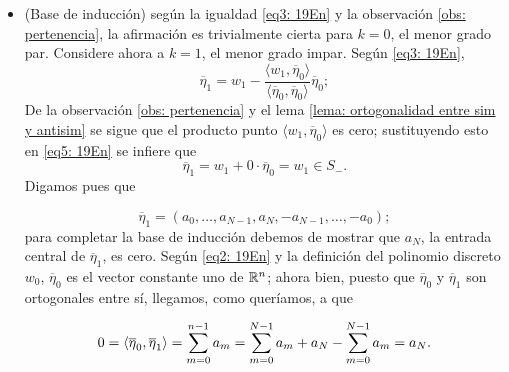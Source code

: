 \begin{itemize}

\item (Base de inducción) según la igualdad
\eqref{eq3: 19En} y la observación 
\ref{obs: pertenencia}, la afirmación 
es trivialmente cierta para $k=0$, el menor grado par.
Considere ahora a $k=1$, el menor grado impar. Según 
\eqref{eq3: 19En}, 
\begin{equation}
\label{eq5: 19En}
\overline{\eta}_{1}= w_{1}
- \frac{\langle w_{1}, \overline{\eta}_{0} \rangle}
{\langle \overline{\eta}_{0}, \overline{\eta}_{0} \rangle}\overline{\eta}_{0};
\end{equation}
De la observación 
\ref{obs: pertenencia} y el lema
\ref{lema: ortogonalidad entre sim y antisim} se sigue
que el producto punto $\langle w_{1}, \overline{\eta}_{0} \rangle$
es cero; sustituyendo esto en \eqref{eq5: 19En}
se infiere que 
\[
\overline{\eta}_{1} = w_{1} + 0 \cdot \overline{\eta}_{0}=
w_{1} \in S_{-}.
\]
Digamos pues que

\[
\overline{\eta}_{1} = 
(a_{0}, \ldots , a_{N-1}, a_{N}, -a_{N-1}, \ldots , -a_{0} );
\]
para completar la base de inducción debemos de mostrar
que $a_{N}$, la entrada central de $\overline{\eta}_{1}$,
es cero. Según \eqref{eq2: 19En} y
la definición del polinomio discreto $w_{0}$, 
$\overline{\eta}_{0}$ es el vector constante uno de $\mathbb{R}^{n}$;
ahora bien, puesto que $\overline{\eta}_{0}$
y $\overline{\eta}_{1}$
son ortogonales entre sí, llegamos, como queríamos, a que

\[
0 = \langle \overline{\eta}_{0}, \overline{\eta}_{1}\rangle
= \sum\limits_{m=0}^{n-1}a_{m} = 
\sum\limits_{m=0}^{N-1}a_{m} +a_{N} -
\sum\limits_{m=0}^{N-1}a_{m} = a_{N}.
\]




\end{itemize}
